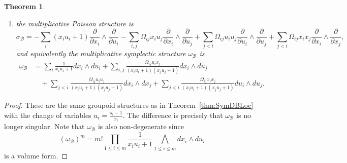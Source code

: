 \documentclass{amsart}
\newtheorem{theorem}{Theorem}[section]
\numberwithin{equation}{section}
\newcommand{\cB}{\mathcal{B}}
\begin{document}
\begin{theorem}
\begin{enumerate}
        where $u''_j = \left( u'_j (x_ju_j+1) \prod_{i=1}^m (x_iu_i+1)^{\Omega_{ij}} + u_j \right)$;
    \item the multiplicative Poisson structure is
    \begin{equation}
	\sigma_\cB = -\sum_{i} (x_i u_i + 1) \frac{\partial}{\partial x_i} \wedge \frac{\partial}{\partial u_i} - \sum_{i, j} \Omega_{ij}x_i u_j \frac{\partial}{\partial x_i} \wedge \frac{\partial}{\partial u_j} +\sum_{j < i} \Omega_{ij}u_iu_j \frac{\partial}{\partial u_i} \wedge \frac{\partial}{\partial u_j} + \sum_{j < i} \Omega_{ij}x_ix_j \frac{\partial}{\partial x_i} \wedge \frac{\partial}{\partial x_j},
    \end{equation}
    and equivalently the multiplicative symplectic structure $\omega_\cB$ is
    \begin{align*} 
	\omega_\cB & = \sum_{i} \frac{1}{x_iu_i+1}dx_i \wedge du_i + \sum_{i, j} \frac{\Omega_{ij}u_ix_j}{(x_iu_i+1)(x_ju_j+1)}  dx_i \wedge du_j \\
	& \quad + \sum_{j < i}\frac{\Omega_{ij}u_iu_j}{(x_iu_i+1)(x_ju_j+1)}  dx_i \wedge dx_j + \sum_{j < i} \frac{\Omega_{ij}x_ix_j}{(x_iu_i+1)(x_ju_j+1)}  du_i \wedge du_j.
      \end{align*}
  \end{enumerate}
\end{theorem}

\begin{proof}
  These are the same groupoid structures as in Theorem~\ref{thm:SymDBLoc} with the change of variables $u_i = \frac{s_i-1}{x_i}$.
  The difference is precisely that $\omega_\cB$ is no longer singular.
  Note that $\omega_\cB$ is also non-degenerate since
  \[(\omega_\cB)^m = m!  \prod_{1\leq i\leq m} \frac{1}{x_iu_i+1} \bigwedge\limits_{1\leq i\leq m} dx_i \wedge du_i\]
  is a volume form.
\end{proof}
\end{document}
